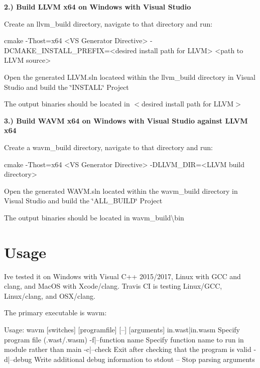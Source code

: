 {\bfseries 2.) Build L\+L\+VM x64 on Windows with Visual Studio}

Create an llvm\+\_\+build directory, navigate to that directory and run\+: \begin{DoxyVerb}cmake -Thost=x64 <VS Generator Directive> -DCMAKE_INSTALL_PREFIX=<desired install path for LLVM> <path to LLVM source>
\end{DoxyVerb}


Open the generated L\+L\+V\+M.\+sln locateed within the \textquotesingle{}llvm\+\_\+build\textquotesingle{} directory in Visual Studio and build the \char`\"{}\+I\+N\+S\+T\+A\+L\+L\char`\"{} Project

The output binaries should be located in {\ttfamily $<$desired install path for L\+L\+VM$>$}

{\bfseries 3.) Build W\+A\+VM x64 on Windows with Visual Studio against L\+L\+VM x64}

Create a wavm\+\_\+build directory, navigate to that directory and run\+: \begin{DoxyVerb}cmake -Thost=x64 <VS Generator Directive> -DLLVM_DIR=<LLVM build directory>\lib\cmake{}
\end{DoxyVerb}


Open the generated W\+A\+V\+M.\+sln located within the \textquotesingle{}wavm\+\_\+build\textquotesingle{} directory in Visual Studio and build the \char`\"{}\+A\+L\+L\+\_\+\+B\+U\+I\+L\+D\char`\"{} Project

The output binaries should be located in {\ttfamily wavm\+\_\+build\textbackslash{}bin}

\section*{Usage}

I\textquotesingle{}ve tested it on Windows with Visual C++ 2015/2017, Linux with G\+CC and clang, and Mac\+OS with Xcode/clang. Travis CI is testing Linux/\+G\+CC, Linux/clang, and O\+S\+X/clang.

The primary executable is {\ttfamily wavm}\+: 
\begin{DoxyCode}
Usage: wavm [switches] [programfile] [--] [arguments]
  in.wast|in.wasm       Specify program file (.wast/.wasm)
  -f|--function name        Specify function name to run in module rather than main
  -c|--check            Exit after checking that the program is valid
  -d|--debug            Write additional debug information to stdout
  --                Stop parsing arguments
\end{DoxyCode}


